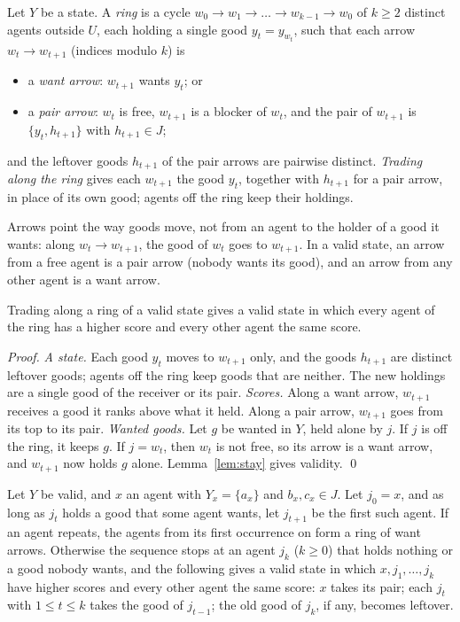 \documentclass[runningheads,11pt]{llncs}
\begin{document}
\begin{definition}[rings]\label{def:ring}
Let $Y$ be a state. A \emph{ring} is a cycle $w_0\to w_1\to\dots\to w_{k-1}\to w_0$ of $k\ge2$ distinct agents outside $U$, each holding a single good $y_t=y_{w_t}$, such that each arrow $w_t\to w_{t+1}$ (indices modulo $k$) is
\begin{itemize}
\item a \emph{want arrow}: $w_{t+1}$ wants $y_t$; or
\item a \emph{pair arrow}: $w_t$ is free, $w_{t+1}$ is a blocker of $w_t$, and the pair of $w_{t+1}$ is $\{y_t,h_{t+1}\}$ with $h_{t+1}\in J$;
\end{itemize}
and the leftover goods $h_{t+1}$ of the pair arrows are pairwise distinct. \emph{Trading along the ring} gives each $w_{t+1}$ the good $y_t$, together with $h_{t+1}$ for a pair arrow, in place of its own good; agents off the ring keep their holdings.
\end{definition}

\noindent Arrows point the way goods move, not from an agent to the holder of a good it wants: along $w_t\to w_{t+1}$, the good of $w_t$ goes to $w_{t+1}$. In a valid state, an arrow from a free agent is a pair arrow (nobody wants its good), and an arrow from any other agent is a want arrow.

\begin{lemma}[ring]\label{lem:ring}
Trading along a ring of a valid state gives a valid state in which every agent of the ring has a higher score and every other agent the same score.
\end{lemma}

\begin{proof}
\emph{A state.} Each good $y_t$ moves to $w_{t+1}$ only, and the goods $h_{t+1}$ are distinct leftover goods; agents off the ring keep goods that are neither. The new holdings are a single good of the receiver or its pair.
\emph{Scores.} Along a want arrow, $w_{t+1}$ receives a good it ranks above what it held. Along a pair arrow, $w_{t+1}$ goes from its top to its pair.
\emph{Wanted goods.} Let $g$ be wanted in $Y$, held alone by $j$. If $j$ is off the ring, it keeps $g$. If $j=w_t$, then $w_t$ is not free, so its arrow is a want arrow, and $w_{t+1}$ now holds $g$ alone. Lemma~\ref{lem:stay} gives validity. \qed
\end{proof}

\begin{lemma}[chain]\label{lem:chain}
Let $Y$ be valid, and $x$ an agent with $Y_x=\{a_x\}$ and $b_x,c_x\in J$. Let $j_0=x$, and as long as $j_t$ holds a good that some agent wants, let $j_{t+1}$ be the first such agent. If an agent repeats, the agents from its first occurrence on form a ring of want arrows. Otherwise the sequence stops at an agent $j_k$ ($k\ge0$) that holds nothing or a good nobody wants, and the following gives a valid state in which $x,j_1,\dots,j_k$ have higher scores and every other agent the same score: $x$ takes its pair; each $j_t$ with $1\le t\le k$ takes the good of $j_{t-1}$; the old good of $j_k$, if any, becomes leftover.
\end{lemma}
\end{document}
